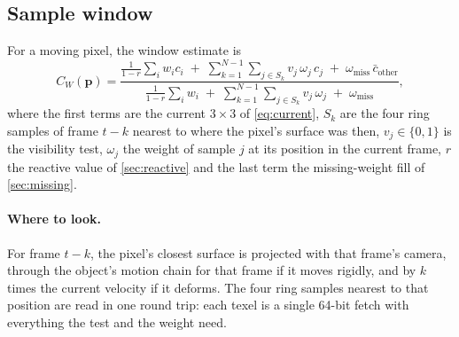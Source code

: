 \documentclass[11pt,a4paper]{article}
\newcommand{\vect}[1]{\mathbf{#1}}
\begin{document}
\subsection{Sample window}
\label{sec:window}

For a moving pixel, the window estimate is
\begin{equation}
C_W(\vect p) = \frac{\frac{1}{1-r}\sum_{i} w_i c_i \;+\; \sum_{k=1}^{N-1} \sum_{j\in S_k} v_j\, \omega_j\, c_j \;+\; \omega_{\mathrm{miss}}\, \bar c_{\mathrm{other}}}{\frac{1}{1-r}\sum_i w_i \;+\; \sum_{k=1}^{N-1}\sum_{j\in S_k} v_j\, \omega_j \;+\; \omega_{\mathrm{miss}}},
\label{eq:window}
\end{equation}
where the first terms are the current $3\times3$ of \cref{eq:current}, $S_k$ are the four ring samples of frame $t-k$ nearest to where the pixel's surface was then, $v_j\in\{0,1\}$ is the visibility test, $\omega_j$ the weight of sample $j$ at its position in the current frame, $r$ the reactive value of \cref{sec:reactive} and the last term the missing-weight fill of \cref{sec:missing}.

\paragraph{Where to look.} For frame $t-k$, the pixel's closest surface is projected with that frame's camera, through the object's motion chain for that frame if it moves rigidly, and by $k$ times the current velocity if it deforms. The four ring samples nearest to that position are read in one round trip: each texel is a single 64-bit fetch with everything the test and the weight need.
\end{document}
